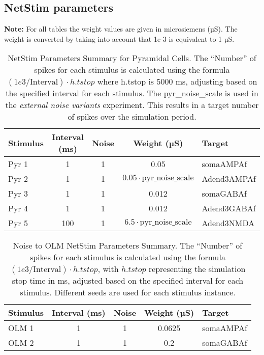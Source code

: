 \subsection{NetStim parameters}
\textbf{Note:} For all tables the weight values are given in microsiemens (µS).
The weight is converted by taking into account that 1e-3 is equivalent to 1 µS.
\begin{table}[htbp]
    \centering
    \caption[NetStim Parameters Pyramidal cells]{NetStim Parameters Summary for Pyramidal Cells.
        The ``Number'' of spikes for each stimulus is calculated using the formula \((1e3 / \text{Interval}) \cdot h.tstop\) where h.tstop is 5000 ms,
        adjusting based on the specified interval for each stimulus.
        The pyr\_noise\_scale is used in the \textit{external noise variants} experiment.
        This results in a target number of spikes over the simulation period.}\label{table:netstimparams_pyr}
    \begin{tabular}{lcccl}
        \hline
        Stimulus & Interval (ms) & Noise & Weight (µS)                             & Target      \\
        \hline
        Pyr 1    & 1             & 1     & 0.05                                    & somaAMPAf   \\
        Pyr 2    & 1             & 1     & \(0.05 \cdot \text{pyr\_noise\_scale}\) & Adend3AMPAf \\
        Pyr 3    & 1             & 1     & 0.012                                   & somaGABAf   \\
        Pyr 4    & 1             & 1     & 0.012                                   & Adend3GABAf \\
        Pyr 5    & 100           & 1     & \(6.5 \cdot \text{pyr\_noise\_scale}\)  & Adend3NMDA  \\ \hline
    \end{tabular}
\end{table}

\begin{table}[htbp]
    \centering
    \caption[Noise to OLM Parameters]{Noise to OLM NetStim Parameters Summary.
        The ``Number'' of spikes for each stimulus is calculated using the formula \((1e3 / \text{Interval}) \cdot h.tstop\),
        with \(h.tstop\) representing the simulation stop time in ms,
        adjusted based on the specified interval for each stimulus.
        Different seeds are used for each stimulus instance.}\label{tab:noise_to_OLM}
    \begin{tabular}{lcccl}
        \hline
        Stimulus & Interval (ms) & Noise & Weight (µS) & Target    \\
        \hline
        OLM 1    & 1             & 1     & 0.0625      & somaAMPAf \\
        OLM 2    & 1             & 1     & 0.2         & somaGABAf \\
        \hline
    \end{tabular}
\end{table}

